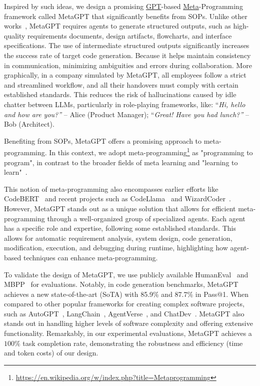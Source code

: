 Inspired by such ideas, we design a promising \underline{GPT}-based \underline{Meta}-Programming framework called {MetaGPT} that significantly benefits from SOPs. 
%
Unlike other works~\citep{li2023camel,qian2023communicative}, MetaGPT requires agents to generate structured outputs, such as high-quality requirements documents, design artifacts, flowcharts, and interface specifications. 
%
The use of intermediate structured outputs significantly increases the success rate of target code generation.
%
Because it helps maintain consistency in communication, minimizing ambiguities and errors during collaboration.
%
More graphically, in a company simulated by MetaGPT, all employees follow a strict and streamlined workflow, and all their handovers must comply with certain established standards. This reduces the risk of hallucinations caused by idle chatter between LLMs, particularly in role-playing frameworks, like: ``\textit{Hi, hello and how are you?''} -- Alice (Product Manager); ``\textit{Great! Have you had lunch?''} -- Bob (Architect).


Benefiting from SOPs, MetaGPT offers a promising approach to meta-programming. In this context, we adopt meta-programming\footnote{\href{https://en.wikipedia.org/w/index.php?title=Metaprogramming}{https://en.wikipedia.org/w/index.php?title=Metaprogramming}} as "programming to program", in contrast to the broader fields of meta learning and "learning to learn"~\citep{schmidhuber1987evolutionary,Schmidhuber:93selfreficann,Hochreiter:01meta,Schmidhuber:05gmai,finn2017model}. 

This notion of meta-programming also encompasses earlier efforts like CodeBERT~\citep{feng2020codebert} and recent projects such as CodeLlama~\citep{roziere2023code} and WizardCoder~\citep{luo2023wizardcoder}. 
However, MetaGPT stands out as a unique solution that allows for efficient meta-programming through a well-organized group of specialized agents. Each agent has a specific role and expertise, following some established standards. This allows for automatic requirement analysis, system design, code generation, modification, execution, and debugging during runtime, highlighting how agent-based techniques can enhance meta-programming.


To validate the design of MetaGPT, we use publicly available HumanEval~\citep{chen2021evaluating} and MBPP~\citep{austin2021program} for evaluations. 
%
Notably, in code generation benchmarks, MetaGPT achieves a new state-of-the-art (SoTA) with 85.9\% and 87.7\% in Pass@1.
%
When compared to other popular frameworks for creating complex software projects, such as AutoGPT~\citep{autogpt_github}, LangChain~\citep{Chase_LangChain_2022}, AgentVerse~\citep{agentverse_github}, and ChatDev~\citep{qian2023communicative}. MetaGPT also stands out in handling higher levels of software complexity and offering extensive functionality.
%
Remarkably, in our experimental evaluations, MetaGPT achieves a $100\%$ task completion rate, demonstrating the robustness and efficiency (time and token costs) of our design.

